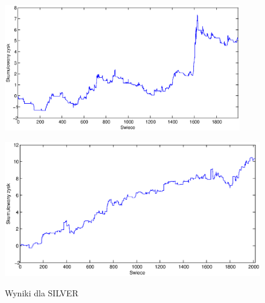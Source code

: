 \begin{figure}[h]
\begin{minipage}{.49\linewidth}
\label{cztero}
\end{minipage}
\begin{minipage}{.49\linewidth}
\centering
\includegraphics[width=0.92\textwidth]{images/S1d_silver.eps}
\label{mansard}
\end{minipage}
\begin{minipage}{\linewidth}
\centering
\includegraphics[width=\textwidth]{images/S1s_silver.eps}
\label{mansard}
\end{minipage}
\caption{Wyniki dla SILVER}
\end{figure}
\FloatBarrier
